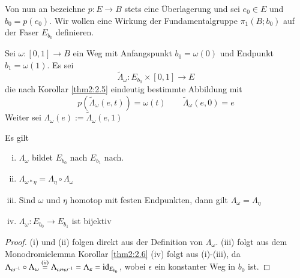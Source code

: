 \documentclass[a4paper,10pt]{scrartcl}
\begin{document}
Von nun an bezeichne $p: E \to B$ stets eine Überlagerung und sei $e_0 \in E$ und $b_0=p(e_0)$.
Wir wollen eine Wirkung der Fundamentalgruppe $\pi_1(B; b_0)$ auf der Faser $E_{b_0}$ definieren.\\

\begin{df}
 Sei $\omega:[0,1]\to B$ ein Weg mit Anfangspunkt $b_0=\omega(0)$ und Endpunkt $b_1=\omega(1)$. Es sei
\[
 \tilde \Lambda_\omega: E_{b_0} \times [0,1] \to E
\]
die nach Korollar \ref{thm2:2.5} eindeutig bestimmte Abbildung mit
\[
 p(\tilde \Lambda_\omega (e,t))=\omega(t) \qquad \tilde \Lambda_{\omega}(e,0)=e
\]
Weiter sei $\Lambda_\omega(e):= \tilde \Lambda_\omega(e,1)$
\end{df}
\begin{lem}\label{thm2:3.7}
 Es gilt
\begin{enumerate}[(i)]
 \item $\Lambda_\omega$ bildet $E_{b_0}$ nach $E_{b_1}$ nach.
 \item $\Lambda_{\omega*\eta}=\Lambda_{\eta} \circ \Lambda_\omega$
 \item Sind $\omega$ und $\eta$ homotop mit festen Endpunkten, dann gilt $\Lambda_\omega=\Lambda_\eta$
 \item $\Lambda_\omega: E_{b_0} \to E_{b_1}$ ist bijektiv
\end{enumerate}
\end{lem}
\begin{proof}
 (i) und (ii)  folgen direkt aus der Definition von $\Lambda_\omega$. (iii) folgt aus dem Monodromielemma Korollar \ref{thm2:2.6} (iv) folgt aus (i)-(iii), da $\Lambda_{\omega^{-1}}\circ \Lambda_\omega\stackrel{(ii)}{=} \Lambda_{\omega*\omega^{-1}}=\Lambda_\varepsilon=\operatorname{id}_{E_{b_0}}$, wobei $\epsilon$ ein konstanter Weg in $b_0$ ist. 
\end{proof}
\end{document}
